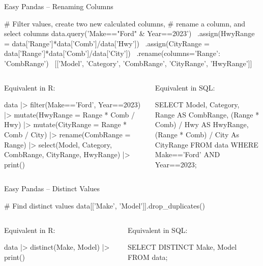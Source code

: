 \documentclass[ignorenonframetext,xcolor=x11names]{beamer}
\begin{document}
\begin{frame}[fragile]{Easy Pandas -- Renaming Columns}

\begin{pythoncode}
# Filter values, create two new calculated columns,
# rename a column, and select columns
data.query('Make=="Ford" & Year==2023') \
  .assign(HwyRange = data['Range']*data['Comb']/data['Hwy']) \
  .assign(CityRange = data['Range']*data['Comb']/data['City']) \
  .rename(columns={'Range': 'CombRange'}) \
  [['Model', 'Category', 'CombRange', 'CityRange', 'HwyRange']]
\end{pythoncode}

\vspace{\baselineskip}

\begin{columns}
\begin{column}{.5\textwidth}

Equivalent in R:
\begin{Rcode}
data |> 
  filter(Make=='Ford', 
         Year==2023) |> 
  mutate(HwyRange = 
     Range * Comb / Hwy) |>
  mutate(CityRange = 
     Range * Comb / City) |>
  rename(CombRange = Range) |>
  select(Model, Category, 
         CombRange, CityRange, 
         HwyRange) |>
  print()
\end{Rcode}
\end{column}
\begin{column}{.5\textwidth}
Equivalent in SQL:
\begin{sqlcode}
SELECT Model, Category, 
      Range AS CombRange,
      (Range * Comb) / Hwy 
          AS HwyRange, 
      (Range * Comb) / City 
          As CityRange
   FROM data 
   WHERE Make=='Ford' AND 
         Year==2023;
\end{sqlcode}
\end{column}
\end{columns}
\end{frame}

\begin{frame}[fragile]{Easy Pandas -- Distinct Values}
\begin{pythoncode}
# Find distinct values
data[['Make', 'Model']].drop_duplicates()
\end{pythoncode}

\vspace{\baselineskip}
\begin{columns}
\begin{column}{.5\textwidth}
Equivalent in R:

\begin{Rcode}
data |> 
  distinct(Make, Model) |>
  print()
\end{Rcode}
\end{column}
\begin{column}{.5\textwidth}
Equivalent in SQL:

\begin{sqlcode}
SELECT DISTINCT Make, Model 
  FROM data;
\end{sqlcode}
\end{column}
\end{columns}
\end{frame}
\end{document}
